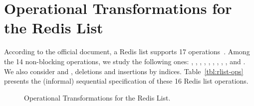 \section{Operational Transformations for the Redis List}  \label{section:rlist-ot}



According to the official document,
a Redis list supports 17 operations~\cite{rlist}.
Among the 14 non-blocking operations, 
we study the following ones:
\lpush, \rpush, \lpushx, \rpushx,
\lpop, \rpop, \linsert, \lset, \ltrim, and \lrem.
We also consider \ldel{} and \lins,
deletions and insertions by indices.
Table~\ref{tbl:rlist-ops} presents the (informal) sequential specification
of these 16 Redis list operations.

\begin{figure}[t]
  \centering
  
  \caption{Operational Transformations for the Redis List.}
  \label{fig:rlist-ot}
\end{figure}
